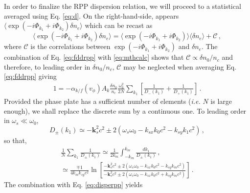 \documentclass[
 reprint,
 amsmath,amssymb,
 aps,
]{revtex4-1}
\begin{document}
In order to finalize the RPP dispersion relation, we will proceed to a statistical averaged using Eq. \eqref{eq:d}. On the right-hand-side, appears $\langle\exp(-i\Phi_{k_1}+i\Phi_{k_2})\delta n_e \rangle$ which can be recast as
\begin{equation}
\langle\exp(-i\Phi_{k_1}+i\Phi_{k_2})\delta n_e \rangle= \langle\exp(-i\Phi_{k_1}+i\Phi_{k_2}) \rangle\langle\delta n_e \rangle + \mathcal{C}\, , \label{eq:mthcalc}
\end{equation}
where $\mathcal{C}$ is the correlations   between  \mbox{$\exp(-i\Phi_{k_1}+i\Phi_{k_2})$} and $\delta n_e$. The combination of Eq. \eqref{eq:fddrpp} with \eqref{eq:mthcalc} shows that $\mathcal{C}\propto \delta n_0/n_c$ and therefore, to leading order in $\delta n_0/n_c$, $\mathcal{C}$ may  be neglected when  averaging   Eq. \eqref{eq:fddrpp} giving
\begin{align}
  1= -\alpha_{k/f}(v_\phi)A_k \frac{\delta n_0}{n_c} \frac{\omega_0^2}{2N}\sum_{ k_{1} }        \left[ \frac{1 }{D_-(k_{1})} +\frac{1}{D_+(k_{1})} \right] \, .\label{eq:disperpp} 
\end{align}
Provided the phase plate has a sufficient number of elements (\emph{i.e.} $N$ is large enough), we shall replace the discrete sum by a continuous one. To leading order 
in  $\omega_s\ll\omega_0$, 
\begin{equation}\label{eq:dpmk1}
D_\pm(k_1) \simeq -\mathbf{k}_s^2c^2\pm 2(\omega_s\omega_0 - k_{sx}k_0 c^2-k_{sy} k_1 c^2) \, , 
\end{equation} 
so that,
\begin{align}
 \frac{1}{N} \sum_{ k_{1} }  \frac{1 }{D_\pm(k_{1})}  \simeq \frac{1}{2k_m} \int_{ -k_m }^{ k_m }       \frac{dk_1 }{D_\pm(k_{1})}  \, , \nonumber\\
 \simeq \frac{\mp1}{4k_mk_{sy}c^2} \ln\left[
 \frac{ -\mathbf{k}_s^2c^2\pm 2(\omega_s\omega_0 - k_{sx}k_0 c^2-k_{sy} k_m c^2)}{ -\mathbf{k}_s^2c^2\pm 2(\omega_s\omega_0 - k_{sx}k_0 c^2+k_{sy} k_m c^2)} \right] \, .\label{eq:sumint} 
\end{align}
The combination with Eq. \eqref{eq:disperpp} yields
\end{document}
